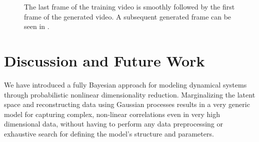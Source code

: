 \documentclass{article} %
\begin{document}
\begin{figure}[ht]
\begin{center}
\end{center}
\caption{ \small{
The last frame of the training video  is smoothly followed by the first frame  of the generated video. A subsequent generated frame can be seen in }.}
\label{fig:dog}
\end{figure}


\section{Discussion and Future Work}

We have introduced a fully Bayesian approach for modeling dynamical
systems through probabilistic nonlinear dimensionality
reduction. Marginalizing the latent space and reconstructing data
using Gaussian processes results in a very generic model for capturing
complex, non-linear correlations even in very high dimensional data,
without having to perform any data preprocessing or exhaustive search
for defining the model's structure and parameters.

\end{document}
